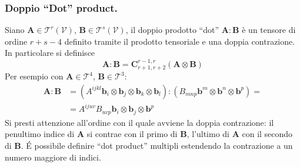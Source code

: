  \subsubsection{Doppio ``Dot'' product.}
 Siano $\bm{A} \in \mathcal{T}^r(\mathcal{V})$, $\bm{B} \in \mathcal{T}^s(\mathcal{V})$, il doppio prodotto ``dot'' $\bm{A} : \bm{B}$ è un tensore di ordine $r+s-4$ definito tramite il prodotto tensoriale e una doppia contrazione.
  In particolare si definisce
 \begin{equation}
  \bm{A} : \bm{B} = \bm{C}^{r-1,r}_{r+1,r+2} (\bm{A} \otimes \bm{B})
 \end{equation}
 Per esempio con $\bm{A} \in \mathcal{T}^4$, $\bm{B} \in \mathcal{T}^3$:
 \begin{equation}
 \begin{aligned}
  \bm{A} : \bm{B} & = (A^{ijkl} \bm{b}_i \otimes \bm{b}_j \otimes \bm{b}_k\otimes \bm{b}_l)
                             : (B_{mnp} \bm{b}^m \otimes \bm{b}^n \otimes \bm{b}^p) = \\
   & = A^{ijuv} B_{uvp} \bm{b}_i \otimes \bm{b}_j  \otimes \bm{b}^p
 \end{aligned}
 \end{equation}
 Si presti attenzione all'ordine con il quale avviene la doppia contrazione: il penultimo indice di $\bm{A}$ si contrae con il primo di $\bm{B}$, l'ultimo di $\bm{A}$ con il secondo di $\bm{B}$. \'E possibile definire ``dot product'' multipli estendendo la contrazione a un numero maggiore di indici.
 
